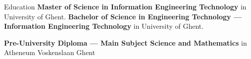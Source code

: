 \begin{rubric}{Education}
\entry*[Expected 2026]%
	\textbf{Master of Science in Information Engineering Technology} in University of Ghent.
%
\entry*[Expected 2025]%
	\textbf{Bachelor of Science in Engineering Technology — Information Engineering Technology} in University of Ghent.\par
% 
\entry*[2014 -- 2020]%
	\textbf{Pre-University Diploma — Main Subject Science and Mathematics} in Atheneum Voskenslaan Ghent \par
	
\end{rubric}